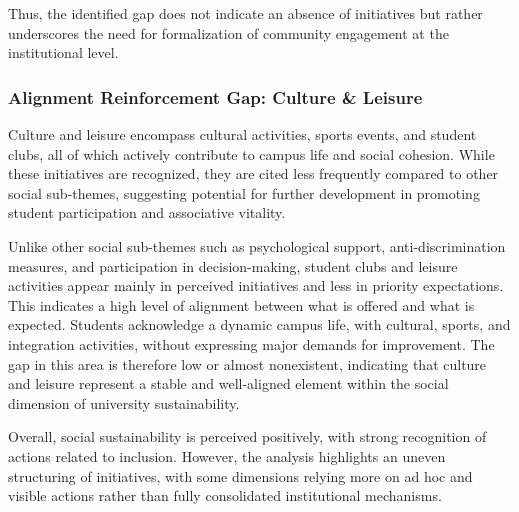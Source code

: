 \documentclass[12pt,a4paper]{article}
\begin{document}
Thus, the identified gap does not indicate an absence of initiatives but rather underscores the need for formalization of community engagement at the institutional level.

\subsubsection{Alignment Reinforcement Gap: Culture \& Leisure}

Culture and leisure encompass cultural activities, sports events, and student clubs, all of which actively contribute to campus life and social cohesion. While these initiatives are recognized, they are cited less frequently compared to other social sub-themes, suggesting potential for further development in promoting student participation and associative vitality.

Unlike other social sub-themes such as psychological support, anti-discrimination measures, and participation in decision-making, student clubs and leisure activities appear mainly in perceived initiatives and less in priority expectations. This indicates a high level of alignment between what is offered and what is expected. Students acknowledge a dynamic campus life, with cultural, sports, and integration activities, without expressing major demands for improvement. The gap in this area is therefore low or almost nonexistent, indicating that culture and leisure represent a stable and well-aligned element within the social dimension of university sustainability.

Overall, social sustainability is perceived positively, with strong recognition of actions related to inclusion. However, the analysis highlights an uneven structuring of initiatives, with some dimensions relying more on ad hoc and visible actions rather than fully consolidated institutional mechanisms.

\renewcommand{\arraystretch}{1.2}
\footnotesize

\renewcommand{\arraystretch}{1.2}
\footnotesize
\end{document}
